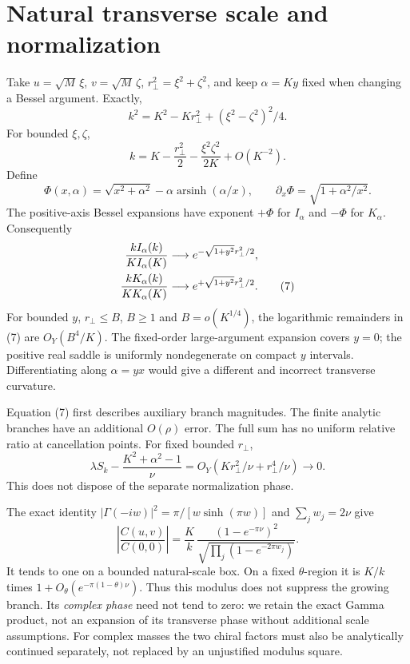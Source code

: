 \documentclass[11pt,a4paper]{article}
\begin{document}
\newpage
\section{Natural transverse scale and normalization}
Take \(u=\sqrt M\,\xi\), \(v=\sqrt M\,\zeta\), \(r_\perp^2=\xi^2+\zeta^2\),
and keep \(\alpha=Ky\) fixed when changing a Bessel argument.
Exactly,
\[
 k^2=K^2-Kr_\perp^2+(\xi^2-\zeta^2)^2/4 .
\]
For bounded \(\xi,\zeta\),
\[
 k=K-\frac{r_\perp^2}{2}-\frac{\xi^2\zeta^2}{2K}+O(K^{-2}).
\]
Define
\[
 \Phi(x,\alpha)=\sqrt{x^2+\alpha^2}
       -\alpha\operatorname{arsinh}(\alpha/x),\qquad
 \partial_x\Phi=\sqrt{1+\alpha^2/x^2}.
\]
The positive-axis Bessel expansions \cite{bessel} have exponent
\(+\Phi\) for \(I_\alpha\) and \(-\Phi\) for \(K_\alpha\).
Consequently
\begin{align}
 \frac{kI_\alpha(k)}{KI_\alpha(K)}
   &\longrightarrow e^{-\sqrt{1+y^2}r_\perp^2/2},\notag\\
 \frac{kK_\alpha(k)}{KK_\alpha(K)}
   &\longrightarrow e^{+\sqrt{1+y^2}r_\perp^2/2}.                  \tag{7}
\end{align}
For bounded \(y\), \(r_\perp\le B\), \(B\ge1\) and
\(B=o(K^{1/4})\), the logarithmic remainders in (7) are
\(O_Y(B^4/K)\). The fixed-order large-argument expansion covers \(y=0\);
the positive real saddle is uniformly nondegenerate on compact \(y\)
intervals. Differentiating along \(\alpha=yx\) would give a different
and incorrect transverse curvature.

Equation (7) first describes auxiliary branch magnitudes.
The finite analytic branches have an additional \(O(\rho)\) error.
The full sum has no uniform relative ratio at cancellation points.
For fixed bounded \(r_\perp\),
\[
 \lambda S_k-\frac{K^2+\alpha^2-1}{\nu}
 =O_Y(Kr_\perp^2/\nu+r_\perp^4/\nu)\longrightarrow0 .
\]
This does not dispose of the separate normalization phase.

The exact identity
\(|\Gamma(-iw)|^2=\pi/[w\sinh(\pi w)]\) and
\(\sum_jw_j=2\nu\) give
\[
 \left|\frac{C(u,v)}{C(0,0)}\right|
 =\frac Kk\,
 \frac{(1-e^{-\pi\nu})^2}
 {\sqrt{\prod_j(1-e^{-2\pi w_j})}} .                              \tag{8}
\]
It tends to one on a bounded natural-scale box. On a fixed
\(\theta\)-region it is \(K/k\) times
\(1+O_\theta(e^{-\pi(1-\theta)\nu})\).
Thus this modulus does not suppress the growing branch.
Its \emph{complex phase} need not tend to zero: we retain the exact
Gamma product, not an expansion of its transverse phase without
additional scale assumptions. For complex masses the two chiral factors
must also be analytically continued separately, not replaced by an
unjustified modulus square.
\end{document}
